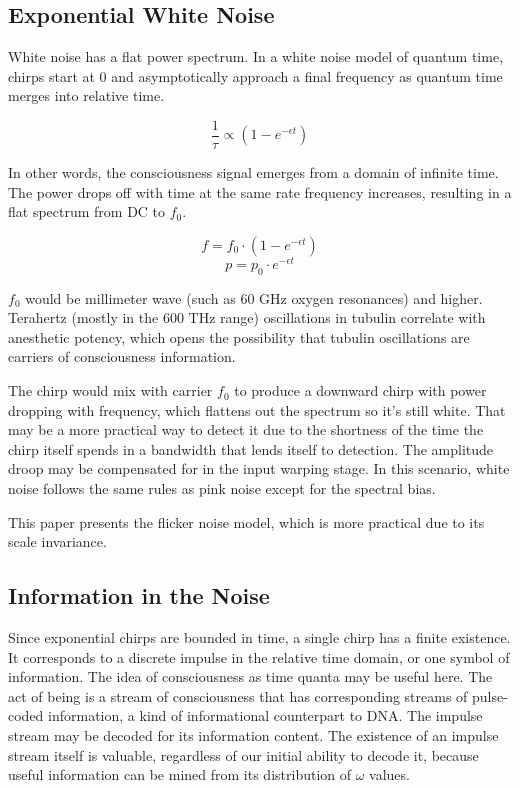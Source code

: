 \subsection{Exponential White Noise}

White noise has a flat power spectrum.
In a white noise model of quantum time, chirps start at 0 and asymptotically
approach a final frequency as quantum time merges into relative time.

\begin{equation} \label{eq:white}
\frac{1}{\tau} \propto (1-e^{-\epsilon t})
\end{equation}

In other words, the consciousness signal emerges from a domain of infinite time.
The power drops off with time at the same rate frequency increases,
resulting in a flat spectrum from DC to $f_0$.

\begin{equation}
f = f_0 \cdot (1-e^{-\epsilon t})
\end{equation}
\begin{equation}
p = p_0 \cdot e^{-\epsilon t}
\end{equation}

$f_0$ would be millimeter wave (such as 60 GHz oxygen resonances) and higher.
Terahertz (mostly in the 600 THz range) oscillations in tubulin \cite{Craddock}
correlate with anesthetic potency, which opens the possibility that
tubulin oscillations are carriers of consciousness information.

The chirp would mix with carrier $f_0$ to produce a downward chirp with
power dropping with frequency,
which flattens out the spectrum so it's still white.
That may be a more practical way to detect it due to the shortness of the
time the chirp itself spends in a bandwidth that lends itself to detection.
The amplitude droop may be compensated for in the input warping stage.
In this scenario, white noise follows the same rules as pink noise except
for the spectral bias.

This paper presents the flicker noise model, which is more practical due to
its scale invariance.

\subsection{Information in the Noise}

Since exponential chirps are bounded in time, a single chirp has a finite
existence. It corresponds to a discrete impulse in the relative time domain,
or one symbol of information.
The idea of consciousness as time quanta may be useful here.
The act of being is a stream of consciousness that has corresponding streams
of pulse-coded information, a kind of informational counterpart to DNA.
The impulse stream may be decoded for its information content.
The existence of an impulse stream itself is valuable,
regardless of our initial ability to decode it, because useful information
can be mined from its distribution of $\omega$ values.


